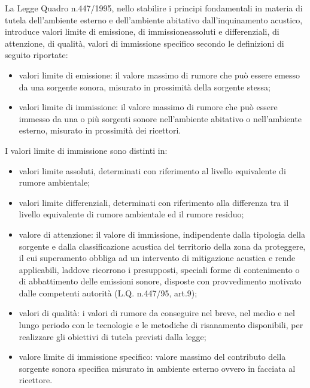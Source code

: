 La Legge Quadro n.447/1995, nello stabilire i principi fondamentali in materia di tutela dell'ambiente esterno e dell'ambiente abitativo dall'inquinamento acustico, introduce valori limite di emissione, di immissioneassoluti e differenziali, 
di attenzione, di qualità, valori di immissione specifico secondo le definizioni di seguito riportate:
\begin{itemize}
\item valori limite di emissione: il valore massimo di rumore che può essere emesso da una sorgente sonora, misurato in prossimità della sorgente stessa;
\item valori limite di immissione: il valore massimo di rumore che può essere immesso da una o più sorgenti sonore nell'ambiente abitativo o nell'ambiente esterno, misurato in prossimità dei ricettori. 
\end{itemize}

I valori limite di immissione sono distinti in:
\begin{itemize}
\item valori limite assoluti, determinati con riferimento al livello equivalente di rumore ambientale;
\item valori limite differenziali, determinati con riferimento alla differenza tra il livello equivalente di rumore ambientale ed il rumore residuo;
\end{itemize}

\begin{itemize}
\item valore di attenzione: il valore di immissione, indipendente dalla tipologia della sorgente e dalla classificazione acustica del territorio della zona da proteggere, il cui superamento obbliga ad un intervento di mitigazione acustica e rende applicabili, laddove
ricorrono i presupposti, speciali forme di contenimento o di abbattimento delle emissioni sonore, disposte con provvedimento motivato dalle competenti autorità (L.Q. n.447/95, art.9);
\item valori di qualità: i valori di rumore da conseguire nel breve, nel medio e nel lungo periodo con le tecnologie e le metodiche di risanamento disponibili, per realizzare gli obiettivi di tutela previsti dalla legge;
\item valore limite di immissione specifico: valore massimo del contributo della sorgente sonora specifica misurato in ambiente esterno ovvero in facciata al ricettore.
\end{itemize}

